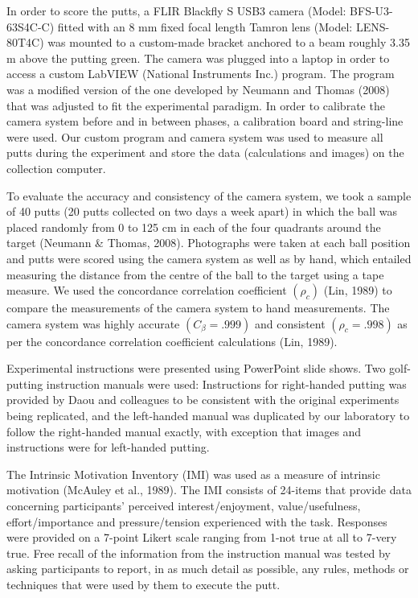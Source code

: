 \documentclass[
  english,
  man,floatsintext]{apa7}
\begin{document}
In order to score the putts, a FLIR Blackfly S USB3 camera (Model: BFS-U3-63S4C-C) fitted with an 8 mm fixed focal length Tamron lens (Model: LENS-80T4C) was mounted to a custom-made bracket anchored to a beam roughly 3.35 m above the putting green. The camera was plugged into a laptop in order to access a custom LabVIEW (National Instruments Inc.) program. The program was a modified version of the one developed by Neumann and Thomas (2008) that was adjusted to fit the experimental paradigm. In order to calibrate the camera system before and in between phases, a calibration board and string-line were used. Our custom program and camera system was used to measure all putts during the experiment and store the data (calculations and images) on the collection computer.

To evaluate the accuracy and consistency of the camera system, we took a sample of 40 putts (20 putts collected on two days a week apart) in which the ball was placed randomly from 0 to 125 cm in each of the four quadrants around the target (Neumann \& Thomas, 2008). Photographs were taken at each ball position and putts were scored using the camera system as well as by hand, which entailed measuring the distance from the centre of the ball to the target using a tape measure. We used the concordance correlation coefficient \((\rho_{c})\) (Lin, 1989) to compare the measurements of the camera system to hand measurements. The camera system was highly accurate \((C_{\beta} = .999)\) and consistent \((\rho_{c} = .998)\) as per the concordance correlation coefficient calculations (Lin, 1989).

Experimental instructions were presented using PowerPoint slide shows. Two golf-putting instruction manuals were used: Instructions for right-handed putting was provided by Daou and colleagues to be consistent with the original experiments being replicated, and the left-handed manual was duplicated by our laboratory to follow the right-handed manual exactly, with exception that images and instructions were for left-handed putting.

The Intrinsic Motivation Inventory (IMI) was used as a measure of intrinsic motivation (McAuley et al., 1989). The IMI consists of 24-items that provide data concerning participants' perceived interest/enjoyment, value/usefulness, effort/importance and pressure/tension experienced with the task. Responses were provided on a 7-point Likert scale ranging from 1-not true at all to 7-very true. Free recall of the information from the instruction manual was tested by asking participants to report, in as much detail as possible, any rules, methods or techniques that were used by them to execute the putt.
\end{document}
